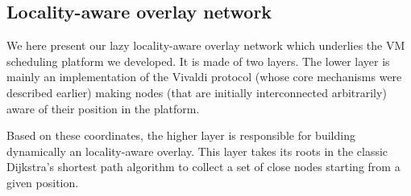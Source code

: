 
\subsection{Locality-aware  overlay network \label{ssec:lao}}

We here present our lazy locality-aware overlay network which underlies the VM
scheduling platform we developed. It is made of two layers. The lower layer is
mainly an implementation of the Vivaldi protocol (whose core mechanisms were
described earlier) making nodes (that are initially interconnected arbitrarily)
aware of their position in the platform. 

Based on these coordinates, the higher layer is responsible for building
dynamically an locality-aware overlay. This layer takes its roots in the classic
Dijkstra's shortest path algorithm to collect a set of close nodes starting from
a given position.







